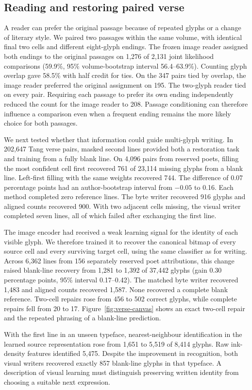 \subsection*{Reading and restoring paired verse}
A reader can prefer the original passage because of repeated glyphs or a change of literary style. We paired two passages within the same volume, with identical final two cells and different eight-glyph endings. The frozen image reader assigned both endings to the original passages on 1,276 of 2,131 joint likelihood comparisons (59.9\%, 95\% volume-bootstrap interval 56.4--63.9\%). Counting glyph overlap gave 58.5\% with half credit for ties. On the 347 pairs tied by overlap, the image reader preferred the original assignment on 195. The two-glyph reader tied on every pair. Requiring each passage to prefer its own ending independently reduced the count for the image reader to 208. Passage conditioning can therefore influence a comparison even when a frequent ending remains the more likely choice for both passages.

We next tested whether that information could guide multi-glyph writing. In 202,647 Tang verse pairs, masked second lines provided both a restoration task and training from a fully blank line. On 4,096 pairs from reserved poets, filling the most confident cell first recovered 761 of 23,114 missing glyphs from a blank line. Left-first filling with the same weights recovered 744. The difference of 0.07 percentage points had an author-bootstrap interval from $-0.05$ to 0.16. Each method completed zero reference lines. The byte writer recovered 916 glyphs and aligned counts recovered 900. With two adjacent cells missing, the visual writer completed seven lines, all of which failed after exchanging the first line.

The image encoder had received a weak learning signal for the identity of each visible glyph. We therefore trained it to recover the canonical bitmap of every source cell and every surviving target cell, using the same classifier as for writing. Across 6,362 lines from 156 separately reserved poet attributions, this change raised blank-line recovery from 1,281 to 1,392 of 37,442 glyphs (gain 0.30 percentage points, 95\% interval 0.17--0.42). The matched byte writer recovered 1,483 and aligned counts recovered 1,587. None recovered a complete blank reference. Two-cell repairs rose from 456 to 502 correct glyphs, while complete repairs fell from 20 to 17. Figure~\ref{fig:verse-canvas} shows an exact two-cell repair and the repeated phrasing of a blank-line prediction.

With the first line in an unseen typeface, nearest-neighbour identification in the learned source representation rose from 1,651 to 5,519 of 8,414 glyphs. Raw ink-density features identified 5,475. Despite the improvement in recognition, both visual writers recovered exactly 857 blank-line glyphs in that typeface. A description of visual learning must distinguish preserving written identity from choosing a suitable next expression.
